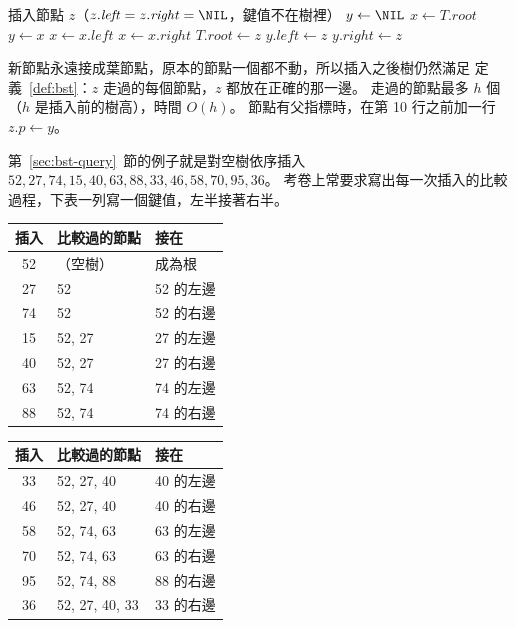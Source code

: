 \begin{pseudo}[label=alg:bst-insert]{插入節點 $z$（$z.\mathit{left} = z.\mathit{right} = \NIL$，鍵值不在樹裡）}
    \State $y \gets \NIL$ 
    \State $x \gets T.\mathit{root}$
        \State $y \gets x$
            \State $x \gets x.\mathit{left}$
        \Else
            \State $x \gets x.\mathit{right}$
        \EndIf
    \EndWhile
        \State $T.\mathit{root} \gets z$ 
        \State $y.\mathit{left} \gets z$
    \Else
        \State $y.\mathit{right} \gets z$
    \EndIf
\EndProcedure
\end{pseudo}

新節點永遠接成葉節點，原本的節點一個都不動，所以插入之後樹仍然滿足
定義~\ref{def:bst}：$z$ 走過的每個節點，$z$ 都放在正確的那一邊。 走過的節點最多
$h$ 個（$h$ 是插入前的樹高），時間 $O(h)$。 節點有父指標時，在第 10 行之前加一行 $z.p \gets y$。

第~\ref{sec:bst-query}~節的例子就是對空樹依序插入 $52,\allowbreak 27,\allowbreak 74,\allowbreak 15,\allowbreak 40,\allowbreak 63,\allowbreak 88,\allowbreak 33,\allowbreak 46,\allowbreak 58,\allowbreak 70,\allowbreak 95,\allowbreak 36$。 考卷上常要求寫出每一次插入的比較過程，下表一列寫一個鍵值，左半接著右半。

\begin{center}
\begin{tabular}[t]{cll}
\toprule
插入 & 比較過的節點 & 接在 \\
\midrule
52 & （空樹） & 成為根 \\
27 & 52 & 52 的左邊 \\
74 & 52 & 52 的右邊 \\
15 & 52, 27 & 27 的左邊 \\
40 & 52, 27 & 27 的右邊 \\
63 & 52, 74 & 74 的左邊 \\
88 & 52, 74 & 74 的右邊 \\
\bottomrule
\end{tabular}\hspace{1.5em}%
\begin{tabular}[t]{cll}
\toprule
插入 & 比較過的節點 & 接在 \\
\midrule
33 & 52, 27, 40 & 40 的左邊 \\
46 & 52, 27, 40 & 40 的右邊 \\
58 & 52, 74, 63 & 63 的左邊 \\
70 & 52, 74, 63 & 63 的右邊 \\
95 & 52, 74, 88 & 88 的右邊 \\
36 & 52, 27, 40, 33 & 33 的右邊 \\
\bottomrule
\end{tabular}
\end{center}

